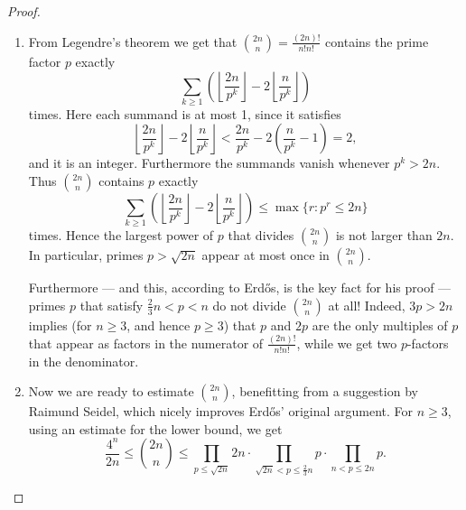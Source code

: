 \begin{proof}
\begin{enumerate}
        All the pieces of this ``one-line computation'' are easy to see. In fact,    
        \[
        \prod_{p \le m + 1} p \le 4^m
        \]
        holds by induction. The inequality
        \[
        \prod_{m + 1 < p \le 2m + 1} p \le \binom{2m + 1}{m}
        \]
        follows from the observation that $\binom{2m + 1}{m} = \frac{(2m + 1)!}{m! (m + 1)!}$ is an integer, where the primes that we consider all are factors of the numerator $(2m + 1)!$, but not of the denominator $m! (m + 1)!$. Finally
        \[
        \binom{2m + 1}{m} \le 2^{2m}
        \]
        holds since
        \[
        \binom{2m + 1}{m} \quad \text{and} \quad \binom{2m + 1}{m + 1}
        \]
        are two (equal!) summands that appear in
        \[
        \sum_{k = 0}^{2m + 1} \binom{2m + 1}{k} = 2^{2m + 1}.
        \]
        
        \item From Legendre's theorem we get that $\binom{2n}{n} = \frac{(2n)!}{n! n!}$ contains the prime factor $p$ exactly
        \[
        \sum_{k \geq 1} \left( \left\lfloor  \frac{2n}{p^k} \right\rfloor - 2 \left\lfloor \frac{n}{p^k} \right\rfloor \right)
        \]
        times. Here each summand is at most 1, since it satisfies
        \[
        \left\lfloor \frac{2n}{p^k} \right\rfloor - 2 \left\lfloor  \frac{n}{p^k}  \right\rfloor < \frac{2n}{p^k} - 2 \left( \frac{n}{p^k} - 1 \right) = 2,
        \]
        and it is an integer. Furthermore the summands vanish whenever $p^k > 2n$. Thus $\binom{2n}{n}$ contains $p$ exactly
        \[
        \sum_{k \geq 1} \left( \left\lfloor  \frac{2n}{p^k} \right\rfloor - 2 \left\lfloor \frac{n}{p^k} \right\rfloor \right) \le \max\{r : p^r \le 2n\}
        \]
        times. Hence the largest power of $p$ that divides $\binom{2n}{n}$ is not larger than $2n$. In particular, primes $p > \sqrt{2n}$ appear at most once in $\binom{2n}{n}$.

        Furthermore --- and this, according to Erdős, is the key fact for his proof --- primes $p$ that satisfy $\frac{2}{3} n < p < n$ do not divide $\binom{2n}{n}$ at all! Indeed, $3p > 2n$ implies (for $n \geq 3$, and hence $p \geq 3$) that $p$ and $2p$ are the only multiples of $p$ that appear as factors in the numerator of $\frac{(2n)!}{n! n!}$, while we get two $p$-factors in the denominator.

        \item Now we are ready to estimate \(\binom{2n}{n}\), benefitting from a suggestion by Raimund Seidel, which nicely improves Erdős' original argument. For \(n \ge 3\), using an estimate for the lower bound, we get
        \[
        \frac{4^n}{2n} \le \binom{2n}{n} \le \prod_{p \le \sqrt{2n}} 2n \cdot \prod_{\sqrt{2n} < p \le \frac{2}{3}n} p \cdot \prod_{n < p \le 2n} p.
        \]


\end{enumerate}
\end{proof}
